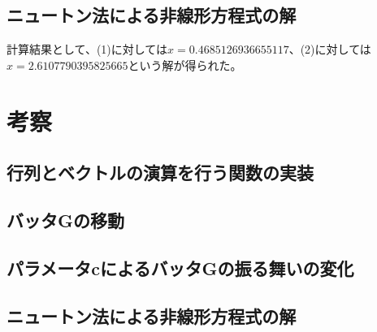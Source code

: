 \documentclass[11pt]{ltjsarticle}
\begin{document}
\subsection{ニュートン法による非線形方程式の解}

計算結果として、(1)に対しては$x = 0.4685126936655117$、(2)に対しては$x = 2.6107790395825665$という解が得られた。


\section{考察}

\subsection{行列とベクトルの演算を行う関数の実装}

\subsection{バッタGの移動}
\subsection{パラメータcによるバッタGの振る舞いの変化}
\subsection{ニュートン法による非線形方程式の解}
\end{document}
